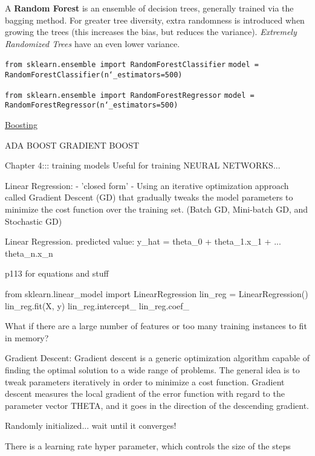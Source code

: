 A \textbf{Random Forest} is an ensemble of decision trees,
generally trained via the bagging method.
For greater tree diversity,
extra randomness is introduced when growing the trees
(this increases the bias, but reduces the variance).
\textit{Extremely Randomized Trees} have an even lower variance.

\texttt{from sklearn.ensemble import RandomForestClassifier}\newline
\texttt{model = RandomForestClassifier(n\char`_estimators=500)}

\texttt{from sklearn.ensemble import RandomForestRegressor}\newline
\texttt{model = RandomForestRegressor(n\char`_estimators=500)}

\underline{Boosting}\newline




ADA BOOST
GRADIENT BOOST








Chapter 4::: training models
Useful for training NEURAL NETWORKS...

Linear Regression:
- 'closed form'
-
Using an iterative optimization approach called Gradient Descent (GD)
that gradually tweaks the model parameters to minimize the cost function over the training set.
(Batch GD, Mini-batch GD, and Stochastic GD)

Linear Regression.
predicted value: y_hat = theta_0 + theta_1.x_1 + ... theta_n.x_n

p113 for equations and stuff

from sklearn.linear_model import LinearRegression
lin_reg = LinearRegression()
lin_reg.fit(X, y)
lin_reg.intercept_
lin_reg.coef_

What if there are a large number of features
or too many training instances to fit in memory?

Gradient Descent:
Gradient descent is a generic optimization algorithm capable of finding the optimal solution to a wide range of problems. 
The general idea is to tweak parameters iteratively in order to minimize a cost function.
Gradient descent measures the local gradient of the error function with regard to the parameter vector THETA,
and it goes in the direction of the descending gradient.

Randomly initialized... wait until it converges!

There is a learning rate hyper parameter, which controls the size of the steps

